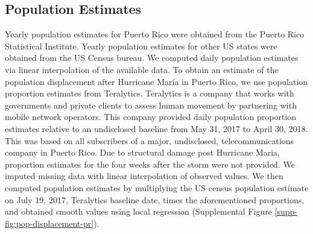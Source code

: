 \documentclass[11pt]{article}
\begin{document}
\subsection{Population Estimates}
\label{subsec:population}
Yearly population estimates for Puerto Rico were obtained from the Puerto Rico Statistical Institute. Yearly population estimates for other US states were obtained from the US Census bureau. We computed daily population estimates via linear interpolation of the available data. To obtain an estimate of the population displacement after Hurricane Mar\'ia in Puerto Rico, we use population proportion estimates from Teralytics. Teralytics is a company that works with governments and private clients to assess human movement by partnering with mobile network operators. This company provided daily population proportion estimates relative to an undisclosed baseline from May 31, 2017 to April 30, 2018. This was based on all subscribers of a major, undisclosed, telecommunications company in Puerto Rico. Due to structural damage post Hurricane Maria, proportion estimates for the four weeks after the storm were not provided. We imputed missing data with linear interpolation of observed values. We then computed population estimates by multiplying the US census population estimate on July 19, 2017, Teralytics baseline date, times the aforementioned proportions, and obtained smooth values using local regression (Supplemental Figure \ref{supp-fig:pop-displacement-pr}).
\end{document}
